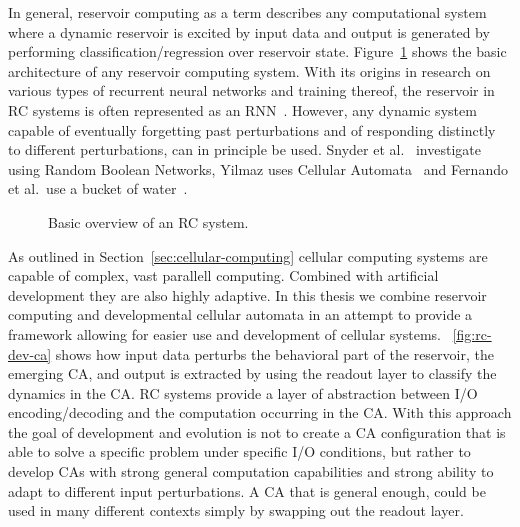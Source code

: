 In general, reservoir computing as a term describes any computational system
where a dynamic reservoir is excited by input data and output is generated by
performing classification/regression over reservoir state.
Figure~\ref{fig:rc-system} shows the basic architecture of any reservoir
computing system. With its origins in research on various types of recurrent
neural networks and training thereof, the reservoir in RC systems is often
represented as an RNN~\cite{Verstraeten2007}. However, any dynamic system
capable of eventually forgetting past perturbations and of responding distinctly
to different perturbations, can in principle be used. Snyder et
al.~\cite{Snyder2013} investigate using Random Boolean Networks, Yilmaz uses
Cellular Automata~\cite{Yilmaz2014} and Fernando et al.\ use a bucket of
water~\cite{Fernando2003}.

\begin{figure}[ht]
  \centering
  \caption{Basic overview of an RC system.}
\label{fig:rc-system}
\end{figure}

As outlined in Section~\ref{sec:cellular-computing} cellular computing systems
are capable of complex, vast parallell computing. Combined with artificial
development they are also highly adaptive. In this thesis we combine reservoir
computing and developmental cellular automata in an attempt to provide a
framework allowing for easier use and development of cellular systems.
\figurename~\ref{fig:rc-dev-ca} shows how input data perturbs the behavioral
part of the reservoir, the emerging CA, and output is extracted by using the
readout layer to classify the dynamics in the CA. RC systems provide a layer of
abstraction between I/O encoding/decoding and the computation occurring in the
CA. With this approach the goal of development and evolution is not to create a
CA configuration that is able to solve a specific problem under specific I/O
conditions, but rather to develop CAs with strong general computation
capabilities and strong ability to adapt to different input perturbations. A CA
that is general enough, could be used in many different contexts simply by
swapping out the readout layer.


